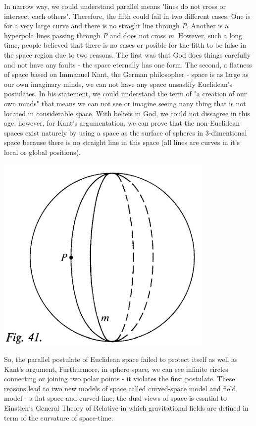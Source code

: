 \documentclass[11pt,a4paper]{article}
\begin{document}
	In narrow way, we could understand parallel means "lines do not cross or intersect each others". Therefore, the fifth could fail in two different cases. One is for a very large curve and there is no straght line through \textit{P}. Another is a hyperpola lines passing through \textit{P} and does not cross \textit{m}.
	 However, such a long time, people believed that there is no cases or posible for the fitth to be false in the space region  due to two reasons. The first was that God does things carefully and not have any faults - the space eternally has one form. The second, a flatness of space based on Immanuel Kant, the German philosopher - space is as large as our own imaginary minds, we can not have any space unsastify Euclidean's postulates. In his statement, we could understand the term of "a creation of our own minds"  that means we can not see or imagine seeing nany thing that is not located in considerable space.  
	 With beliefs in God, we could not dissagree in this age, however, for Kant's argumentation, we can  prove that the non-Euclidean spaces exist naturely by using  a space as the  surface of spheres in 3-dimentional space because there is no straight line in this space (all lines are curves in it's local or global positions). 
	 
	 \begin{center}
	 	\includegraphics[scale=0.35,alt={the sphere with lines connecting two poles}]{./Fig41_sphere.png}
	 \end{center}
	 
	 
	 So, the parallel postulate of Euclidean space failed to protect itself as well as Kant's argument, Furthurmore, in sphere space, we can see infinite circles connecting or joining two polar points - it  violates the first postulate. 
	 These reasons lead to two new models of space called curved-space model and  field model - a flat space and curved line; the dual views of space is essntial to Einstien's General Theory of Relative  in which gravitational fields are defined in term of the curvature of space-time.
	 
\end{document}
